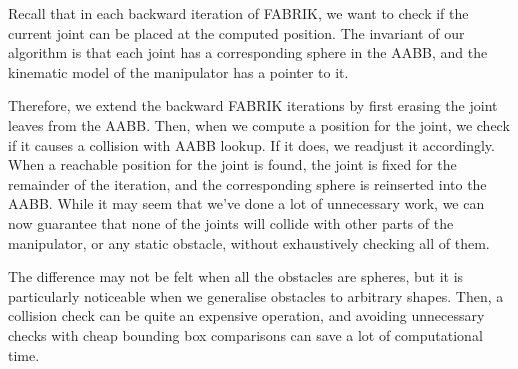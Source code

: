Recall that in each backward iteration of FABRIK, we want to check if the current joint can be placed at the computed position. The invariant of our algorithm is that each joint has a corresponding sphere in the AABB, and the kinematic model of the manipulator has a pointer to it.

Therefore, we extend the backward FABRIK iterations by first erasing the joint leaves from the AABB. Then, when we compute a position for the joint, we check if it causes a collision with AABB lookup. If it does, we readjust it accordingly. When a reachable position for the joint is found, the joint is fixed for the remainder of the iteration, and the corresponding sphere is reinserted into the AABB. While it may seem that we've done a lot of unnecessary work, we can now guarantee that none of the joints will collide with other parts of the manipulator, or any static obstacle, without exhaustively checking all of them.

The difference may not be felt when all the obstacles are spheres, but it is particularly noticeable when we generalise obstacles to arbitrary shapes. Then, a collision check can be quite an expensive operation, and avoiding unnecessary checks with cheap bounding box comparisons can save a lot of computational time.
